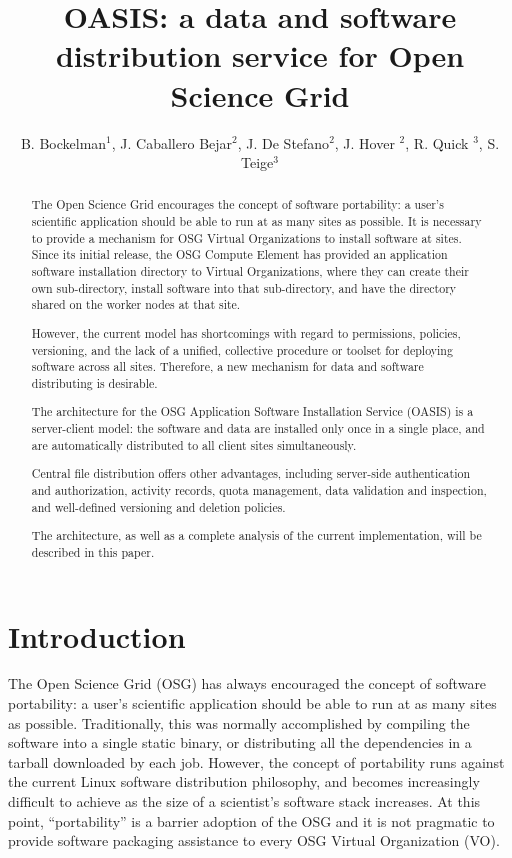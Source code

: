 \documentclass[a4paper]{jpconf}
\begin{document}
\title{OASIS: a data and software distribution service for Open Science Grid}

\author{B. Bockelman$^1$, J. Caballero Bejar$^2$, J. De Stefano$^2$, J. Hover $^2$, R. Quick $^3$, S. Teige$^3$}

\address{$^1$ University of Nebraska-Lincoln, Lincoln, NE 68588, USA}
\address{$^2$ Brookhaven National Laboratory, PO BOX 5000 Upton, NY 11973, USA}
\address{$^3$ Indiana University, Bloomington, IN 47404, USA}


\begin{abstract}
The Open Science Grid encourages the concept of software portability: 
a user's scientific application should be able to run at as many sites as
possible.
It is necessary to provide a mechanism for OSG Virtual Organizations to install software at sites. 
Since its initial release, the OSG Compute Element has provided an application
software installation directory to Virtual Organizations, where they can create
their own sub-directory, install software into that sub-directory, and have the
directory shared on the worker nodes at that site.

However, the current model has shortcomings with regard to permissions,
policies, versioning, and the lack of a unified, collective procedure or toolset for deploying software across all sites. 
Therefore, a new mechanism for data and software distributing is desirable. 

The architecture for the OSG Application Software Installation Service (OASIS) is a server-client model: 
the software and data are installed only once in a single place, 
and are automatically distributed to all client sites simultaneously.

Central file distribution offers other advantages, 
including server-side authentication and authorization, activity records, quota management, 
data validation and inspection, and well-defined versioning and deletion policies.

The architecture, as well as a complete analysis of the current implementation, will be described in this paper. 
\end{abstract}

\section{Introduction}

The Open Science Grid (OSG) \cite{osg} has always encouraged the concept of software portability: 
a user's scientific application should be able to run at as many sites as
possible.
Traditionally, this was normally accomplished by compiling the software into a
single static binary, or distributing all the dependencies in a tarball downloaded by each job.  
However, the concept of portability runs against the current Linux software distribution philosophy, 
and becomes increasingly difficult to achieve as the size of a scientist’s software stack increases.  
At this point, “portability” is a barrier adoption of the OSG and 
it is not pragmatic to provide software packaging assistance to every OSG Virtual Organization (VO).
\end{document}
